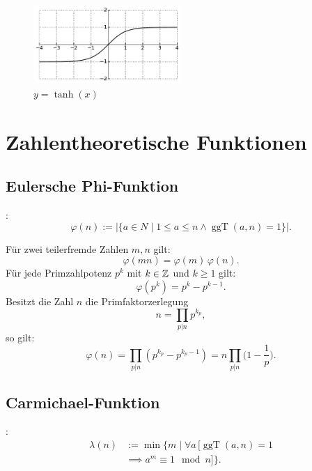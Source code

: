 \begin{figure}[h]
\includegraphics[width=0.5\textwidth]{img/tanh.pdf}
\caption{$y=\tanh(x)$}
\end{figure}

\newpage
\section{Zahlentheoretische Funktionen}
\subsection{Eulersche Phi-Funktion}

\begin{Definition}
:
\begin{equation}
\varphi(n) := |\{a\in N\mid 1\le a\le n\wedge\operatorname{ggT}(a,n)=1\}|.
\end{equation}
\end{Definition}
\noindent
Für zwei teilerfremde Zahlen $m,n$ gilt:
\begin{equation}
\varphi(mn) = \varphi(m)\,\varphi(n).
\end{equation}
Für jede Primzahlpotenz $p^k$ mit $k\in\mathbb Z$ und $k\ge 1$ gilt:
\begin{equation}
\varphi(p^k) = p^k-p^{k-1}.
\end{equation}
Besitzt die Zahl $n$ die Primfaktorzerlegung
\begin{equation}
n=\prod_{p|n} p^{k_p},
\end{equation}
so gilt:
\begin{equation}
\varphi(n) = \prod_{p|n} (p^{k_p}-p^{k_p-1})
= n\prod_{p|n} \Big(1-\frac{1}{p}\Big).
\end{equation}

\subsection{Carmichael-Funktion}
\begin{Definition} :
\begin{equation}
\begin{split}
\lambda(n) &:= \min\{m\mid \forall a\,[\operatorname{ggT}(a,n)=1\\
&\implies a^m\equiv 1\mod n]\}.
\end{split}
\end{equation}
\end{Definition}
